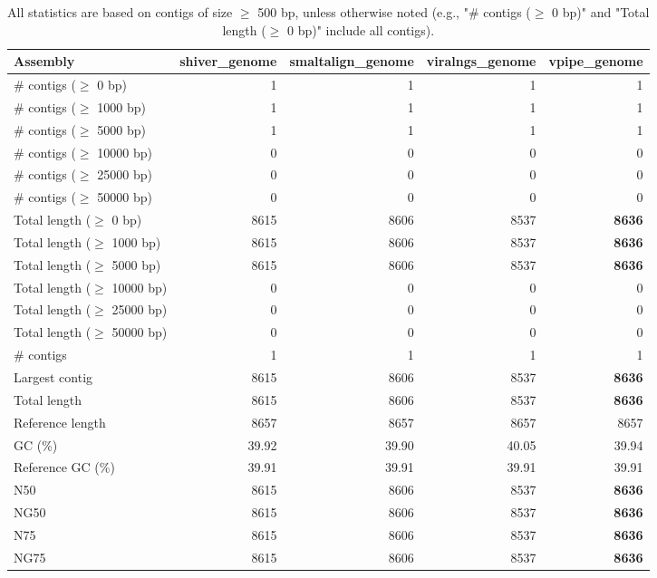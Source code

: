 \documentclass[12pt,a4paper]{article}
\begin{document}
\begin{table}[ht]
\begin{center}
\caption{All statistics are based on contigs of size $\geq$ 500 bp, unless otherwise noted (e.g., "\# contigs ($\geq$ 0 bp)" and "Total length ($\geq$ 0 bp)" include all contigs).}
\begin{tabular}{|l*{4}{|r}|}
\hline
Assembly & shiver\_genome & smaltalign\_genome & viralngs\_genome & vpipe\_genome \\ \hline
\# contigs ($\geq$ 0 bp) & 1 & 1 & 1 & 1 \\ \hline
\# contigs ($\geq$ 1000 bp) & 1 & 1 & 1 & 1 \\ \hline
\# contigs ($\geq$ 5000 bp) & 1 & 1 & 1 & 1 \\ \hline
\# contigs ($\geq$ 10000 bp) & 0 & 0 & 0 & 0 \\ \hline
\# contigs ($\geq$ 25000 bp) & 0 & 0 & 0 & 0 \\ \hline
\# contigs ($\geq$ 50000 bp) & 0 & 0 & 0 & 0 \\ \hline
Total length ($\geq$ 0 bp) & 8615 & 8606 & 8537 & {\bf 8636} \\ \hline
Total length ($\geq$ 1000 bp) & 8615 & 8606 & 8537 & {\bf 8636} \\ \hline
Total length ($\geq$ 5000 bp) & 8615 & 8606 & 8537 & {\bf 8636} \\ \hline
Total length ($\geq$ 10000 bp) & 0 & 0 & 0 & 0 \\ \hline
Total length ($\geq$ 25000 bp) & 0 & 0 & 0 & 0 \\ \hline
Total length ($\geq$ 50000 bp) & 0 & 0 & 0 & 0 \\ \hline
\# contigs & 1 & 1 & 1 & 1 \\ \hline
Largest contig & 8615 & 8606 & 8537 & {\bf 8636} \\ \hline
Total length & 8615 & 8606 & 8537 & {\bf 8636} \\ \hline
Reference length & 8657 & 8657 & 8657 & 8657 \\ \hline
GC (\%) & 39.92 & 39.90 & 40.05 & 39.94 \\ \hline
Reference GC (\%) & 39.91 & 39.91 & 39.91 & 39.91 \\ \hline
N50 & 8615 & 8606 & 8537 & {\bf 8636} \\ \hline
NG50 & 8615 & 8606 & 8537 & {\bf 8636} \\ \hline
N75 & 8615 & 8606 & 8537 & {\bf 8636} \\ \hline
NG75 & 8615 & 8606 & 8537 & {\bf 8636} \\ \hline

\end{tabular}
\end{center}
\end{table}
\end{document}
